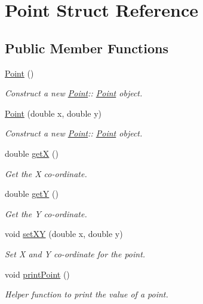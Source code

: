 \hypertarget{classPoint}{}\section{Point Struct Reference}
\label{classPoint}
\subsection*{Public Member Functions}
\begin{DoxyCompactItemize}
\item 
\mbox{\label{classPoint_ad92f2337b839a94ce97dcdb439b4325a}} 
\hyperlink{classPoint_ad92f2337b839a94ce97dcdb439b4325a}{Point} ()
\begin{DoxyCompactList}\small\item\em Construct a new \hyperlink{classPoint}{Point}\+:\+: \hyperlink{classPoint}{Point} object. \end{DoxyCompactList}\item 
\hyperlink{classPoint_a78b55e8d5466bb8c2cf60fa55f2562ff}{Point} (double x, double y)
\begin{DoxyCompactList}\small\item\em Construct a new \hyperlink{classPoint}{Point}\+:\+: \hyperlink{classPoint}{Point} object. \end{DoxyCompactList}\item 
double \hyperlink{classPoint_a8de35a6098cdd7267b4167776da83da6}{getX} ()
\begin{DoxyCompactList}\small\item\em Get the X co-\/ordinate. \end{DoxyCompactList}\item 
double \hyperlink{classPoint_aa278c8bcb8aeb4101023a4baf473b547}{getY} ()
\begin{DoxyCompactList}\small\item\em Get the Y co-\/ordinate. \end{DoxyCompactList}\item 
void \hyperlink{classPoint_ad62d5a34b47be46beab076e61628e470}{set\+XY} (double x, double y)
\begin{DoxyCompactList}\small\item\em Set X and Y co-\/ordinate for the point. \end{DoxyCompactList}\item 
\mbox{\label{classPoint_ad32f6a515be1cf069bf5ea6b89178ae9}} 
void \hyperlink{classPoint_ad32f6a515be1cf069bf5ea6b89178ae9}{print\+Point} ()
\begin{DoxyCompactList}\small\item\em Helper function to print the value of a point. \end{DoxyCompactList}\end{DoxyCompactItemize}
